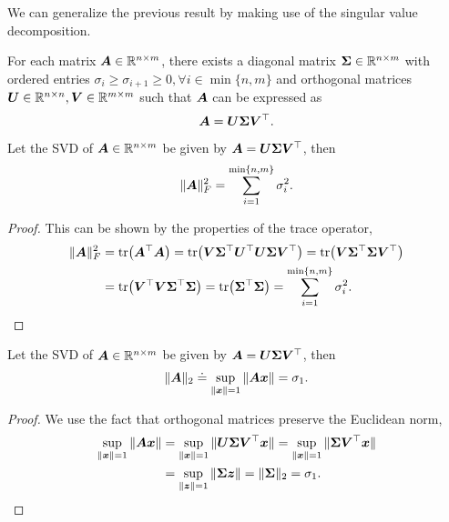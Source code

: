 We can generalize the previous result by making use of the singular value decomposition.

\begin{theorem}
    For each matrix $\bm{A} \in \mathbb{R}^{n \times m}$, there exists a diagonal matrix $\bm{\Sigma} \in
        \mathbb{R}^{n \times m}$ with ordered entries $\sigma_i \geq \sigma_{i+1} \geq 0, \forall i \in
        \min\{ n,m \}$ and orthogonal matrices $\bm{U} \in \mathbb{R}^{n \times n}, \bm{V} \in \mathbb{R}^{m\times
            m}$ such that $\bm{A}$ can be expressed as \[
        \bm{A} = \bm{U} \bm{\Sigma} \bm{V}^\top.
    \]
\end{theorem}

\begin{lemma}
    \label{lem:svd-frob}
    Let the SVD of $\bm{A} \in \mathbb{R}^{n \times m}$ be given by $\bm{A} = \bm{U} \bm{\Sigma} \bm{V}^\top$, then \[
        \| \bm{A} \|_F^2 = \sum_{i=1}^{\min\{n,m\}} \sigma_i^2.
    \]
\end{lemma}

\begin{proof}
    This can be shown by the properties of the trace operator,
    \begin{align*}
        \| \mat{A} \|_F^2 & = \tr{\transpose{\mat{A}} \mat{A}} = \tr{\mat{V} \transpose{\mat{\Sigma}} \transpose{\mat{U}} \mat{U} \mat{\Sigma} \transpose{\mat{V}}} = \tr{\mat{V} \transpose{\mat{\Sigma}} \mat{\Sigma} \transpose{\mat{V}}} \\
                          & = \tr{\transpose{\mat{V}} \mat{V} \transpose{\mat{\Sigma}} \mat{\Sigma}} = \tr{\transpose{\mat{\Sigma}} \mat{\Sigma}} = \sum_{i=1}^{\min \{ n,m \}} \sigma_i^2.
    \end{align*}
\end{proof}

\begin{lemma}
    \label{lem:svd-spectral}
    Let the SVD of $\bm{A} \in \mathbb{R}^{n \times m}$ be given by $\bm{A} = \bm{U} \bm{\Sigma} \bm{V}^\top$, then \[
        \| \bm{A} \|_2 \doteq \sup_{\| \bm{x} \| = 1} \| \bm{A} \bm{x} \| = \sigma_1.
    \]
\end{lemma}

\begin{proof}
    We use the fact that orthogonal matrices preserve the Euclidean norm,
    \begin{align*}
        \sup_{\| \bm{x} \| = 1} \| \bm{A} \bm{x} \| & = \sup_{\| \bm{x} \| = 1} \| \bm{U} \bm{\Sigma} \bm{V}^\top \bm{x} \| = \sup_{\| \bm{x} \| = 1} \| \bm{\Sigma} \bm{V}^\top \bm{x} \| \\
                                                       & = \sup_{\| \bm{z} \| = 1} \| \bm{\Sigma} \bm{z} \| = \| \bm{\Sigma} \|_2 = \sigma_1.
    \end{align*}
\end{proof}

